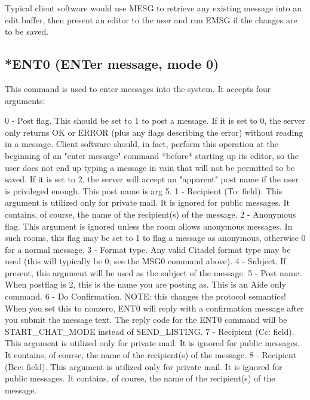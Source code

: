  Typical client software would use MESG to retrieve any existing message into
an edit buffer, then present an editor to the user and run EMSG if the changes
are to be saved.



\subsection{*ENT0 (ENTer message, mode 0)}

 This command is used to enter messages into the system.  It accepts four
arguments:

  0  -  Post flag.  This should be set to 1 to post a message.  If it is
set to 0, the server only returns OK or ERROR (plus any flags describing
the error) without reading in a message.  Client software should, in fact,
perform this operation at the beginning of an "enter message" command
*before* starting up its editor, so the user does not end up typing a message
in vain that will not be permitted to be saved.  If it is set to 2, the
server will accept an "apparent" post name if the user is privileged enough.
This post name is arg 5.
  1  -  Recipient (To: field).  This argument is utilized only for private
mail.  It is ignored for public messages.  It contains, of course, the name
of the recipient(s) of the message.
  2  -  Anonymous flag.  This argument is ignored unless the room allows
anonymous messages.  In such rooms, this flag may be set to 1 to flag a
message as anonymous, otherwise 0 for a normal message.
  3  -  Format type.  Any valid Citadel format type may be used (this will
typically be 0; see the MSG0 command above).
  4  -  Subject.  If present, this argument will be used as the subject of
the message.
  5  -  Post name.  When postflag is 2, this is the name you are posting as.
This is an Aide only command.
  6  -  Do Confirmation.  NOTE: this changes the protocol semantics!  When
you set this to nonzero, ENT0 will reply with a confirmation message after
you submit the message text.  The reply code for the ENT0 command will be
START_CHAT_MODE instead of SEND_LISTING.
  7  -  Recipient (Cc: field).  This argument is utilized only for private
mail.  It is ignored for public messages.  It contains, of course, the name
of the recipient(s) of the message.
  8  -  Recipient (Bcc: field).  This argument is utilized only for private
mail.  It is ignored for public messages.  It contains, of course, the name
of the recipient(s) of the message.

